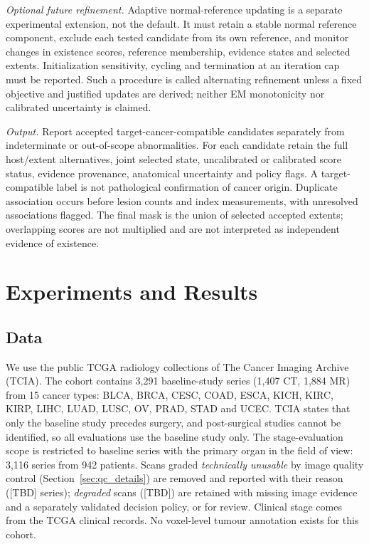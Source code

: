 \documentclass[fleqn,10pt]{olplainarticle}
\begin{document}
\emph{Optional future refinement.}
Adaptive normal-reference updating is a separate experimental extension, not the default. It must retain a stable normal
reference component, exclude each tested candidate from its own reference, and monitor changes in existence scores,
reference membership, evidence states and selected extents. Initialization sensitivity, cycling and termination at an
iteration cap must be reported. Such a procedure is called alternating refinement unless a fixed objective and justified
updates are derived; neither EM monotonicity nor calibrated uncertainty is claimed.

\emph{Output.}
Report accepted target-cancer-compatible candidates separately from indeterminate or out-of-scope abnormalities. For each
candidate retain the full host/extent alternatives, joint selected state, uncalibrated or calibrated score status, evidence
provenance, anatomical uncertainty and policy flags. A target-compatible label is not pathological confirmation of cancer
origin. Duplicate association occurs before lesion counts and index measurements, with unresolved associations flagged.
The final mask is the union of selected accepted extents; overlapping scores are not multiplied and are not interpreted as
independent evidence of existence.

\section{Experiments and Results}
\label{sec:results}

\subsection{Data}
We use the public TCGA radiology collections of The Cancer Imaging Archive (TCIA). The cohort contains 3{,}291
baseline-study series (1{,}407 CT, 1{,}884 MR) from 15 cancer types: BLCA, BRCA, CESC, COAD, ESCA, KICH, KIRC, KIRP,
LIHC, LUAD, LUSC, OV, PRAD, STAD and UCEC. TCIA states that only the baseline study precedes surgery, and post-surgical
studies cannot be identified, so all evaluations use the baseline study only. The stage-evaluation scope is restricted
to baseline series with the primary organ in the field of view: 3{,}116 series from 942 patients. Scans graded \emph{technically unusable} by image quality control (Section~\ref{sec:qc_details}) are removed and reported with their reason ([TBD] series); \emph{degraded} scans ([TBD]) are retained with missing image evidence and a separately validated decision policy, or for review. Clinical stage comes
from the TCGA clinical records. No voxel-level tumour annotation exists for this cohort.
\end{document}
